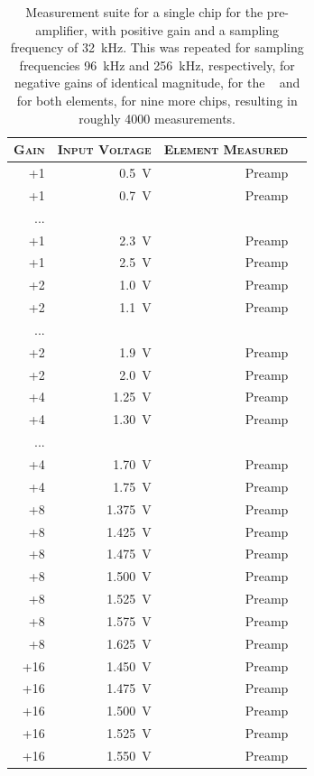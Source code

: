 \begin{table}
    \centering
    \caption{%
            Measurement  suite  for  a  single  chip  for  the  pre-amplifier,
            with    positive    gain    and   a    sampling    frequency    of
            \SI{32}{\kilo\hertz}. This was  repeated for  sampling frequencies
            \SI{96}{\kilo\hertz} and  \SI{256}{\kilo\hertz}, respectively, for
            negative gains of identical magnitude,  for the \sdm~ and for both
            elements,  for nine  more chips,  resulting in  roughly \num{4000}
            measurements.%
        }
    \label{tab:measurementSuite}
    \scriptsize
    \begin{tabular}{rrrr}
        \toprule
        \textsc{Gain} & \textsc{Input Voltage} & \textsc{Element Measured} \\
        \midrule
        +1 & \SI{0.5}{\volt} & Preamp \\
        +1 & \SI{0.7}{\volt} & Preamp \\
        ... & &  \\
        +1 & \SI{2.3}{\volt} & Preamp \\
        +1 & \SI{2.5}{\volt} & Preamp \\
        \midrule
        +2 & \SI{1.0}{\volt} & Preamp \\
        +2 & \SI{1.1}{\volt} & Preamp \\
        ... & &  \\
        +2 & \SI{1.9}{\volt} & Preamp \\
        +2 & \SI{2.0}{\volt} & Preamp \\
        \midrule
        +4 & \SI{1.25}{\volt} & Preamp \\
        +4 & \SI{1.30}{\volt} & Preamp \\
        ... & &  \\
        +4 & \SI{1.70}{\volt} & Preamp \\
        +4 & \SI{1.75}{\volt} & Preamp \\
        \midrule
        +8 & \SI{1.375}{\volt} & Preamp \\
        +8 & \SI{1.425}{\volt} & Preamp \\
        +8 & \SI{1.475}{\volt} & Preamp \\
        +8 & \SI{1.500}{\volt} & Preamp \\
        +8 & \SI{1.525}{\volt} & Preamp \\
        +8 & \SI{1.575}{\volt} & Preamp \\
        +8 & \SI{1.625}{\volt} & Preamp \\
        \midrule
        +16 & \SI{1.450}{\volt} & Preamp \\
        +16 & \SI{1.475}{\volt} & Preamp \\
        +16 & \SI{1.500}{\volt} & Preamp \\
        +16 & \SI{1.525}{\volt} & Preamp \\
        +16 & \SI{1.550}{\volt} & Preamp \\
        \bottomrule
    \end{tabular}
\end{table}

